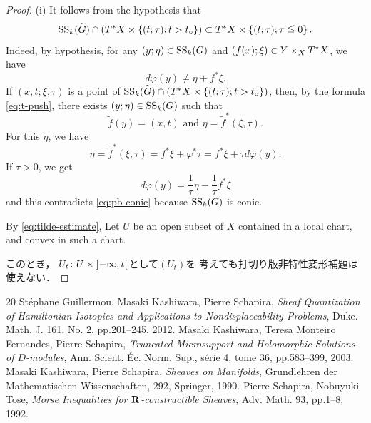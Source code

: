 \begin{proof}
  (i) 
  It follows from the hypothesis that
  \begin{equation}\label{eq:tilde-estimate}
    \muS[k](\widetilde{G})\cap\left(
      \cotb[X]\times\left\{(t;\tau);t>t_{\circ}\right\}
    \right)
    \subset
    \cotb[X]\times\left\{(t;\tau);\tau\leqq0\right\}.
  \end{equation}
  Indeed, by hypothesis, 
  for any \((y;\eta)\in\muS[k](G)\) 
  and \((f(x);\xi)\in Y\tpb[X]\cotb[X]\), 
  we have \begin{equation}\label{eq:pb-conic}
    d\varphi(y)\neq \eta + f^{\ast}\xi.
  \end{equation}
  If \((x,t;\xi,\tau)\) is a point of \(
    \muS[k](\widetilde{G})\cap\left(
      \cotb[X]\times\left\{(t;\tau);t>t_{\circ}\right\}
  \right)\), 
  then, by the formula \eqref{eq:t-push}, 
  there exists \((y;\eta)\in\muS[k](G)\) such that \[
    \tilde{f}(y)=(x,t) 
    \text{ and } 
    \eta=\tilde{f}^{\ast}(\xi,\tau).
  \] For this \(\eta\), we have \[
    \eta
    =\tilde{f}^{\ast}(\xi,\tau)
    =f^{\ast}\xi +\varphi^{\ast}\tau
    =f^{\ast}\xi +\tau d\varphi(y).
  \]
  If \(\tau>0\), we get \[
    d\varphi(y)=\frac{1}{\tau}\eta-\frac{1}{\tau}f^{\ast}\xi
  \] and this contradicts \eqref{eq:pb-conic} 
  because \(\muS[k](G)\) is conic. 

  By \eqref{eq:tilde-estimate}, 
  Let \(U\) be an open subset of \(X\) contained 
  in a local chart, and convex in such a chart. 

  このとき，
  \(U_t\colon U\times \openintvl{-\infty,t}\)として\((U_t)\)を
  考えても打切り版非特性変形補題は使えない．
\end{proof}











\begin{thebibliography}{20} 
   St\'ephane Guillermou, 
  Masaki Kashiwara, Pierre Schapira, 
  \textit{Sheaf Quantization of Hamiltonian Isotopies and Applications to Nondisplaceability Problems}, 
  Duke. Math. J. 161, No. 2, pp.201--245, 2012.  
   Masaki Kashiwara, Teresa Monteiro Fernandes, Pierre Schapira, 
    \textit{Truncated Microsupport and Holomorphic Solutions 
    of \(D\)-modules}, 
    Ann. Scient. \'Ec. Norm. Sup., s\'erie 4, tome 36, 
    pp.583--399, 2003.
   Masaki Kashiwara, Pierre Schapira, 
    \textit{Sheaves on Manifolds}, 
    Grundlehren der Mathematischen Wissenschaften, 292, Springer, 1990.
   Pierre Schapira, Nobuyuki Tose, 
    \textit{Morse Inequalities for \(\rr\)-constructible Sheaves}, 
    Adv. Math. 93, pp.1--8, 1992. 
\end{thebibliography}



